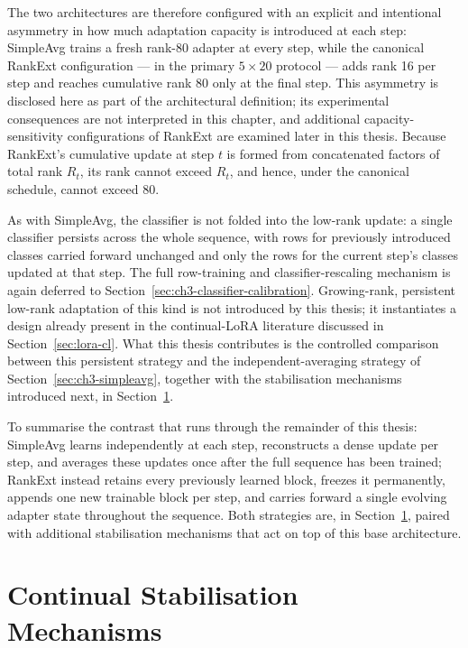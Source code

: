 The two architectures are therefore configured with an explicit and
intentional asymmetry in how much adaptation capacity is introduced at
each step: SimpleAvg trains a fresh rank-80 adapter at every step, while
the canonical RankExt configuration --- in the primary $5\times20$ protocol
--- adds rank 16 per step and reaches cumulative rank 80 only at the final
step. This asymmetry is disclosed
here as part of the architectural definition; its experimental
consequences are not interpreted in this chapter, and additional
capacity-sensitivity configurations of RankExt are examined later in this
thesis. Because RankExt's cumulative update at step $t$ is formed from
concatenated factors of total rank $R_t$, its rank cannot exceed $R_t$,
and hence, under the canonical schedule, cannot exceed 80.

As with SimpleAvg, the classifier is not folded into the low-rank update:
a single classifier persists across the whole sequence, with rows for
previously introduced classes carried forward unchanged and only the rows
for the current step's classes updated at that step. The full row-training
and classifier-rescaling mechanism is again deferred to Section~\ref{sec:ch3-classifier-calibration}. Growing-rank,
persistent low-rank adaptation of this kind is not introduced by this
thesis; it instantiates a design already present in the continual-LoRA
literature discussed in Section~\ref{sec:lora-cl}. What this thesis contributes is the
controlled comparison between this persistent strategy and the
independent-averaging strategy of Section~\ref{sec:ch3-simpleavg}, together with the
stabilisation mechanisms introduced next, in Section~\ref{sec:ch3-stabilization}.

To summarise the contrast that runs through the remainder of this thesis:
SimpleAvg learns independently at each step, reconstructs a dense update
per step, and averages these updates once after the full sequence has been
trained; RankExt instead retains every previously learned block, freezes
it permanently, appends one new trainable block per step, and carries
forward a single evolving adapter state throughout the sequence. Both strategies are, in
Section~\ref{sec:ch3-stabilization}, paired with additional stabilisation mechanisms that act on
top of this base architecture.

\section{Continual Stabilisation Mechanisms}
\label{sec:ch3-stabilization}

